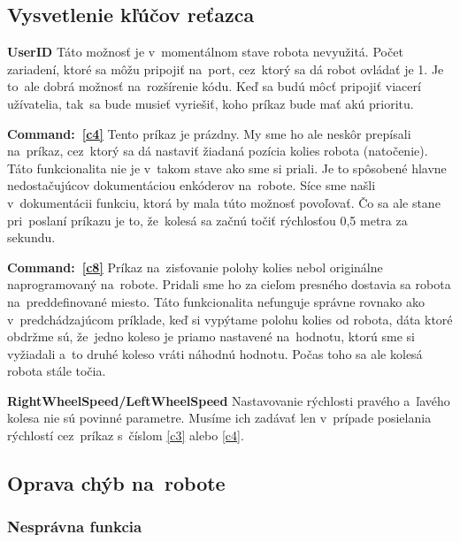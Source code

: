 \subsection{Vysvetlenie kľúčov reťazca}

\noindent \textbf{UserID} \newline
\indent Táto možnosť je v~momentálnom stave robota nevyužitá. Počet zariadení, ktoré sa môžu pripojiť na~port, cez~ktorý sa dá robot ovládať
je 1. Je to~ale dobrá možnosť na~rozšírenie kódu. Keď sa budú môcť pripojiť viacerí užívatelia, tak~sa bude musieť vyriešiť, koho príkaz
bude mať akú prioritu. \newline

\noindent \textbf{Command:~\ref{c4}} \newline
\indent Tento príkaz je prázdny. My sme ho ale neskôr prepísali na~príkaz, cez~ktorý sa dá nastaviť žiadaná pozícia kolies robota (natočenie).
Táto funkcionalita nie je v~takom stave ako sme si priali. Je to spôsobené hlavne nedostačujúcov dokumentáciou enkóderov na~robote. Síce sme našli
v~dokumentácii funkciu, ktorá by mala túto možnosť povoľovať. Čo sa ale stane pri~poslaní príkazu je to, že~kolesá sa začnú točiť rýchlosťou
0,5 metra za sekundu.\newline

\noindent \textbf{Command:~\ref{c8}} \newline
\indent Príkaz na~zisťovanie polohy kolies nebol originálne naprogramovaný na~robote. Pridali sme ho za cieľom presného dostavia sa robota
na~preddefinované miesto. Táto funkcionalita nefunguje správne rovnako ako v~predchádzajúcom príklade, keď si vypýtame polohu kolies od robota,
dáta ktoré obdržme sú, že~jedno koleso je priamo nastavené na~hodnotu, ktorú sme si vyžiadali a~to druhé koleso vráti náhodnú hodnotu.
Počas toho sa ale kolesá robota stále točia.\newline

\noindent \textbf{RightWheelSpeed/LeftWheelSpeed} \newline
\indent Nastavovanie rýchlosti pravého a~ľavého kolesa nie sú povinné parametre. Musíme ich zadávať len v~prípade posielania rýchlostí
cez~príkaz s~číslom \ref{c3} alebo \ref{c4}.

\subsection{Oprava chýb na~robote}

\subsubsection{Nesprávna funkcia}


